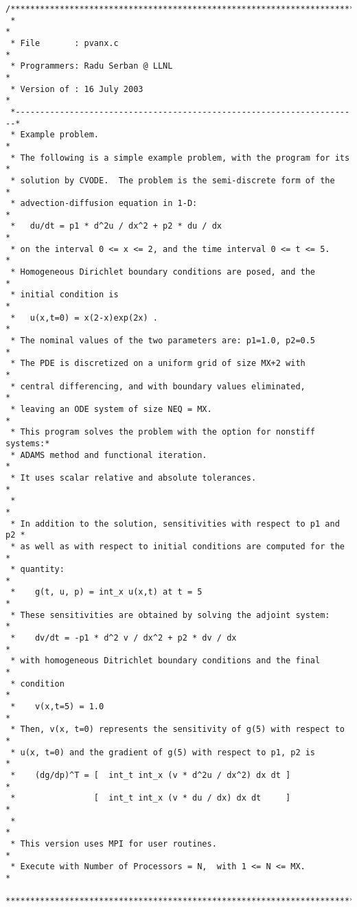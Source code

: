 \begin{verbatim}
/************************************************************************
 *                                                                      *
 * File       : pvanx.c                                                 *
 * Programmers: Radu Serban @ LLNL                                      *
 * Version of : 16 July 2003                                            *
 *----------------------------------------------------------------------*
 * Example problem.                                                     *
 * The following is a simple example problem, with the program for its  *
 * solution by CVODE.  The problem is the semi-discrete form of the     *
 * advection-diffusion equation in 1-D:                                 *
 *   du/dt = p1 * d^2u / dx^2 + p2 * du / dx                            *
 * on the interval 0 <= x <= 2, and the time interval 0 <= t <= 5.      *
 * Homogeneous Dirichlet boundary conditions are posed, and the         *
 * initial condition is                                                 *
 *   u(x,t=0) = x(2-x)exp(2x) .                                         *
 * The nominal values of the two parameters are: p1=1.0, p2=0.5         *
 * The PDE is discretized on a uniform grid of size MX+2 with           *
 * central differencing, and with boundary values eliminated,           *
 * leaving an ODE system of size NEQ = MX.                              *
 * This program solves the problem with the option for nonstiff systems:*
 * ADAMS method and functional iteration.                               *
 * It uses scalar relative and absolute tolerances.                     *
 *                                                                      *
 * In addition to the solution, sensitivities with respect to p1 and p2 *
 * as well as with respect to initial conditions are computed for the   *
 * quantity:                                                            *
 *    g(t, u, p) = int_x u(x,t) at t = 5                                *
 * These sensitivities are obtained by solving the adjoint system:      *
 *    dv/dt = -p1 * d^2 v / dx^2 + p2 * dv / dx                         *
 * with homogeneous Ditrichlet boundary conditions and the final        *
 * condition                                                            *
 *    v(x,t=5) = 1.0                                                    *
 * Then, v(x, t=0) represents the sensitivity of g(5) with respect to   *
 * u(x, t=0) and the gradient of g(5) with respect to p1, p2 is         *
 *    (dg/dp)^T = [  int_t int_x (v * d^2u / dx^2) dx dt ]              *
 *                [  int_t int_x (v * du / dx) dx dt     ]              *
 *                                                                      *
 * This version uses MPI for user routines.                             *
 * Execute with Number of Processors = N,  with 1 <= N <= MX.           *
 ************************************************************************/


\end{verbatim}
